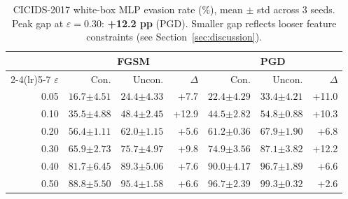 \documentclass[sigconf,anonymous=true]{acmart}
\newcommand{\gap}[1]{\textcolor{deltagreen}{+#1}}
\begin{document}
\begin{table}[t]
\centering
\caption{CICIDS-2017 white-box MLP evasion rate (\%), mean $\pm$ std
         across 3 seeds.  Peak gap at $\varepsilon=0.30$: \textbf{+12.2 pp} (PGD).
         Smaller gap reflects looser feature constraints (see
         Section~\ref{sec:discussion}).}
\label{tab:cicids_wb}
\small
\begin{tabular}{r rr r rr r}
\toprule
 & \multicolumn{3}{c}{\textbf{FGSM}} & \multicolumn{3}{c}{\textbf{PGD}} \\
\cmidrule(lr){2-4}\cmidrule(lr){5-7}
$\varepsilon$ & Con. & Uncon. & $\Delta$ & Con. & Uncon. & $\Delta$ \\
\midrule
0.05 & $16.7{\scriptstyle\pm4.51}$ & $24.4{\scriptstyle\pm4.33}$ & \gap{7.7} &
       $22.4{\scriptstyle\pm4.29}$ & $33.4{\scriptstyle\pm4.21}$ & \gap{11.0} \\
0.10 & $35.5{\scriptstyle\pm4.88}$ & $48.4{\scriptstyle\pm2.45}$ & \gap{12.9} &
       $44.5{\scriptstyle\pm2.82}$ & $54.8{\scriptstyle\pm0.88}$ & \gap{10.3} \\
0.20 & $56.4{\scriptstyle\pm1.11}$ & $62.0{\scriptstyle\pm1.15}$ & \gap{5.6} &
       $61.2{\scriptstyle\pm0.36}$ & $67.9{\scriptstyle\pm1.90}$ & \gap{6.8} \\
0.30 & $65.9{\scriptstyle\pm2.73}$ & $75.7{\scriptstyle\pm4.97}$ & \gap{9.8} &
       $74.9{\scriptstyle\pm3.56}$ & $87.1{\scriptstyle\pm3.82}$ & \gap{12.2} \\
0.40 & $81.7{\scriptstyle\pm6.45}$ & $89.3{\scriptstyle\pm5.06}$ & \gap{7.6} &
       $90.0{\scriptstyle\pm4.17}$ & $96.7{\scriptstyle\pm1.89}$ & \gap{6.6} \\
0.50 & $88.8{\scriptstyle\pm5.50}$ & $95.4{\scriptstyle\pm1.58}$ & \gap{6.6} &
       $96.7{\scriptstyle\pm2.39}$ & $99.3{\scriptstyle\pm0.32}$ & \gap{2.6} \\
\bottomrule
\end{tabular}
\end{table}
\end{document}

